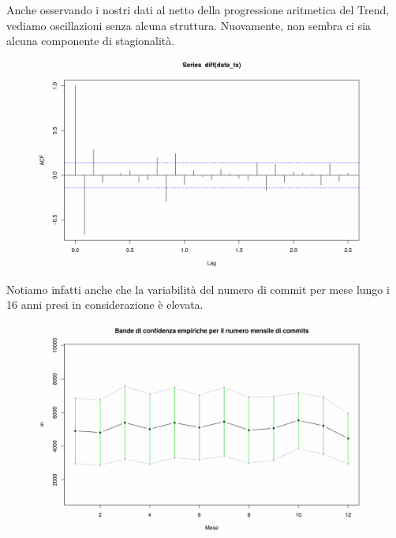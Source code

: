 \documentclass[11pt,a4paper]{article}
\begin{document}
\noindent
Anche osservando i nostri dati al netto della progressione aritmetica
del Trend, vediamo oscillazioni senza alcuna struttura. Nuovamente, non sembra
ci sia alcuna componente di stagionalit\`a.
\clearpage
\begin{figure}[H]
	\vspace{-1.5cm}
	\includegraphics[scale=0.6]{imgs/acf_diff.pdf}
	\vspace{-0.8cm}
\end{figure}
\noindent
Notiamo infatti anche che la variabilit\`a del numero di commit per mese lungo i
16 anni presi in considerazione \`e elevata.
\begin{figure}[H]
	\vspace{-0.3cm}
	\includegraphics[scale=0.6]{imgs/variance.pdf}
	\vspace{-0.9cm}
\end{figure}
\end{document}
